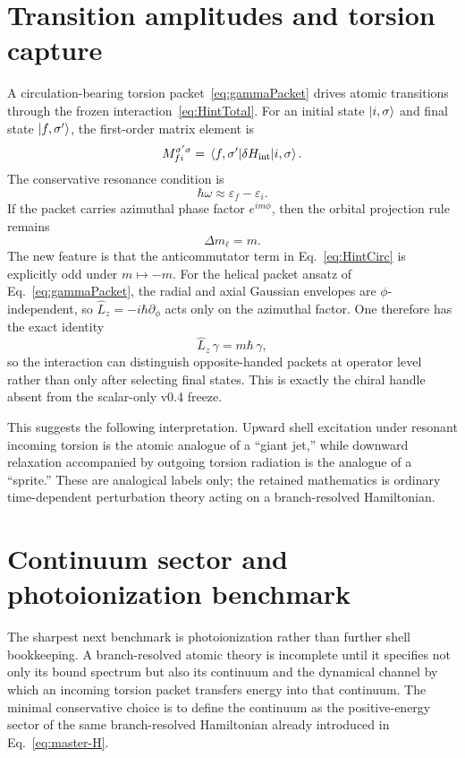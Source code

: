 \documentclass[11pt,a4paper]{article}
\begin{document}
\section{Transition amplitudes and torsion capture}
A circulation-bearing torsion packet~\eqref{eq:gammaPacket} drives atomic transitions through the frozen interaction~\eqref{eq:HintTotal}. For an initial state $\ket{i,\sigma}$ and final state $\ket{f,\sigma'}$, the first-order matrix element is
\begin{equation}
\label{eq:Mfi}
M_{fi}^{\sigma'\sigma}=\matrixel{f,\sigma'}{\delta H_{\rm int}}{i,\sigma}.
\end{equation}
The conservative resonance condition is
\begin{equation}
\label{eq:resonance}
\hbar\omega \approx \varepsilon_f-\varepsilon_i.
\end{equation}
If the packet carries azimuthal phase factor $e^{im\phi}$, then the orbital projection rule remains
\begin{equation}
\label{eq:dm}
\Delta m_\ell = m.
\end{equation}
The new feature is that the anticommutator term in Eq.~\eqref{eq:HintCirc} is explicitly odd under $m\mapsto -m$. For the helical packet ansatz of Eq.~\eqref{eq:gammaPacket}, the radial and axial Gaussian envelopes are $\phi$-independent, so $\hat L_z=-i\hbar\partial_\phi$ acts only on the azimuthal factor. One therefore has the exact identity
\begin{equation}
\label{eq:Lzgamma}
\hat L_z\,\gamma = m\hbar\,\gamma,
\end{equation}
so the interaction can distinguish opposite-handed packets at operator level rather than only after selecting final states. This is exactly the chiral handle absent from the scalar-only v0.4 freeze.

This suggests the following interpretation. Upward shell excitation under resonant incoming torsion is the atomic analogue of a ``giant jet,'' while downward relaxation accompanied by outgoing torsion radiation is the analogue of a ``sprite.'' These are analogical labels only; the retained mathematics is ordinary time-dependent perturbation theory acting on a branch-resolved Hamiltonian.

\section{Continuum sector and photoionization benchmark}
The sharpest next benchmark is photoionization rather than further shell bookkeeping. A branch-resolved atomic theory is incomplete until it specifies not only its bound spectrum but also its continuum and the dynamical channel by which an incoming torsion packet transfers energy into that continuum. The minimal conservative choice is to define the continuum as the positive-energy sector of the same branch-resolved Hamiltonian already introduced in Eq.~\eqref{eq:master-H}.
\end{document}
